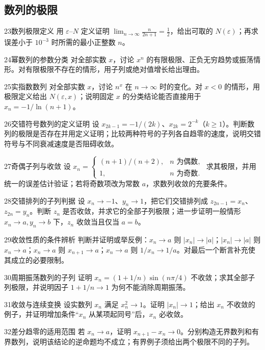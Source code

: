 \subsection{数列的极限}
\begin{exercise}{23}{数列极限定义}
用 $\varepsilon$--$N$ 定义证明 $\lim_{n\to\infty}\frac{n}{2n+1}=\frac12$，给出可取的 $N(\varepsilon)$；再求误差小于 $10^{-3}$ 时所需的最小正整数 $n$。
\end{exercise}
\begin{exercise}{24}{幂数列的参数分类}
对全部实数 $x$，讨论 $x^n$ 的有限极限、正负无穷趋势或振荡情形。对有限极限不存在的情形，用子列或绝对值增长给出理由。
\end{exercise}
\begin{exercise}{25}{实指数数列}
对全部实数 $x$，讨论 $n^x$ 在 $n\to\infty$ 时的变化。对 $x<0$ 的情形，用极限定义给出 $N(\varepsilon,x)$；说明固定 $x$ 的分类结论能否直接用于 $x_n=-1/\ln(n+1)$。
\end{exercise}
\begin{exercise}{26}{交错符号数列的定义证明}
设 $x_{2k-1}=-1/(2k)$、$x_{2k}=2^{-k}$（$k\ge1$）。判断数列的极限是否存在并用定义证明；比较两种符号的子列各自趋零的速度，说明交错符号与不同衰减速度是否阻碍收敛。
\end{exercise}
\begin{exercise}{27}{奇偶子列与收敛}
设 $x_n=\begin{cases}(n+1)/(n+2),&n\text{ 为偶数},\\1,&n\text{ 为奇数}.\end{cases}$ 求其极限，并用统一的误差估计验证；若将奇数项改为常数 $a$，求数列收敛的充要条件。
\end{exercise}
\begin{exercise}{28}{交错排列的子列判据}
设 $x_n\to-1$、$y_n\to1$，把它们交错排列成 $z_{2n-1}=x_n$、$z_{2n}=y_n$。判断 $z_n$ 是否收敛，并求它的全部子列极限；进一步证明一般情形 $x_n\to a,y_n\to b$ 下，$z_n$ 收敛当且仅当 $a=b$。
\end{exercise}
\begin{exercise}{29}{收敛性质的条件辨析}
判断并证明或举反例：$x_n\to a$ 则 $|x_n|\to|a|$；$|x_n|\to|a|$ 则 $x_n\to a$；$x_n\to a$ 则 $x_{n+1}\to a$；$x_n\to a$ 则 $1/x_n\to1/a$。对最后一个断言补充使其成立的必要限制。
\end{exercise}
\begin{exercise}{30}{周期振荡数列的子列}
证明 $x_n=(1+1/n)\sin(n\pi/4)$ 不收敛；求其全部子列极限，并说明因子 $1+1/n\to1$ 为何不能消除周期振荡。
\end{exercise}
\begin{exercise}{31}{收敛与连续变换}
设实数列 $x_n$ 满足 $x_n^2\to1$。证明 $|x_n|\to1$；给出 $x_n$ 不收敛的例子，并证明增加条件“$x_n$ 从某项起同号”后，$x_n$ 必收敛。
\end{exercise}
\begin{exercise}{32}{差分趋零的适用范围}
若 $x_n\to a$，证明 $x_{n+1}-x_n\to0$。分别构造无界数列和有界数列，说明该结论的逆命题均不成立；有界例子须给出两个极限不同的子列。
\end{exercise}
